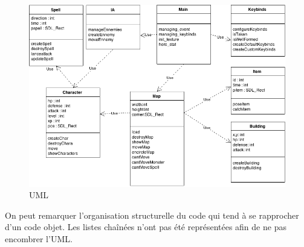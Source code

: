 \begin{figure}[!ht]
    \includegraphics[width=1\textwidth]{./images/uml.png}
    \caption{UML}
\end{figure}

On peut remarquer l'organisation structurelle du code qui tend à se rapprocher d'un code objet. Les listes chaînées n'ont pas été représentées afin de ne pas encombrer l'UML. 

